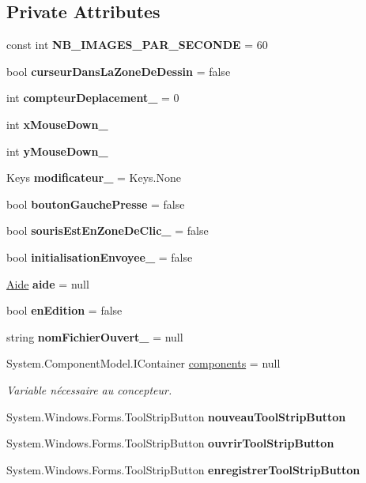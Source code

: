 \subsection*{Private Attributes}
\begin{DoxyCompactItemize}
\item 
const int {\bfseries N\+B\+\_\+\+I\+M\+A\+G\+E\+S\+\_\+\+P\+A\+R\+\_\+\+S\+E\+C\+O\+N\+DE} = 60
\item 
bool {\bfseries curseur\+Dans\+La\+Zone\+De\+Dessin} = false
\item 
int {\bfseries compteur\+Deplacement\+\_\+} = 0
\item 
int {\bfseries x\+Mouse\+Down\+\_\+}
\item 
int {\bfseries y\+Mouse\+Down\+\_\+}
\item 
Keys {\bfseries modificateur\+\_\+} = Keys.\+None
\item 
bool {\bfseries bouton\+Gauche\+Presse} = false
\item 
bool {\bfseries souris\+Est\+En\+Zone\+De\+Clic\+\_\+} = false
\item 
bool {\bfseries initialisation\+Envoyee\+\_\+} = false
\item 
\hyperlink{class_interface_graphique_1_1_aide}{Aide} {\bfseries aide} = null
\item 
bool {\bfseries en\+Edition} = false
\item 
string {\bfseries nom\+Fichier\+Ouvert\+\_\+} = null
\item 
System.\+Component\+Model.\+I\+Container \hyperlink{class_interface_graphique_1_1_edition_a1d25578ac726e295a561fadce2a82540}{components} = null
\begin{DoxyCompactList}\small\item\em Variable nécessaire au concepteur. \end{DoxyCompactList}\item 
System.\+Windows.\+Forms.\+Tool\+Strip\+Button {\bfseries nouveau\+Tool\+Strip\+Button}\hypertarget{class_interface_graphique_1_1_edition_abd44acf79604f433f545c434192a98d9}{}\label{class_interface_graphique_1_1_edition_abd44acf79604f433f545c434192a98d9}

\item 
System.\+Windows.\+Forms.\+Tool\+Strip\+Button {\bfseries ouvrir\+Tool\+Strip\+Button}\hypertarget{class_interface_graphique_1_1_edition_a0ec91b8e3f2d5aca2ce08c89577f84e6}{}\label{class_interface_graphique_1_1_edition_a0ec91b8e3f2d5aca2ce08c89577f84e6}

\item 
System.\+Windows.\+Forms.\+Tool\+Strip\+Button {\bfseries enregistrer\+Tool\+Strip\+Button}\hypertarget{class_interface_graphique_1_1_edition_a02fb7587be462f002f8287538a412089}{}\label{class_interface_graphique_1_1_edition_a02fb7587be462f002f8287538a412089}


\end{DoxyCompactItemize}
